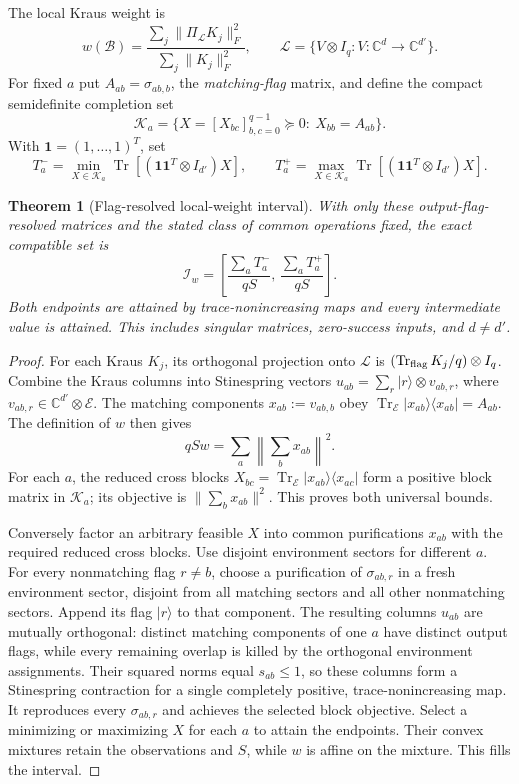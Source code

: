 \documentclass[10pt,letterpaper]{article}
\newtheorem{theorem}{Theorem}
\newcommand{\Tr}{\operatorname{Tr}}
\newcommand{\cB}{\mathcal B}
\newcommand{\K}{\mathcal K}
\newcommand{\C}{\mathbb C}
\begin{document}
The local Kraus weight is
\[
 w(\cB)=\frac{\sum_j\|\Pi_{\mathcal L}K_j\|_F^2}
                  {\sum_j\|K_j\|_F^2},\qquad
 \mathcal L=\{V\otimes I_q: V:\C^d\to\C^{d'}\}.
\]
For fixed $a$ put $A_{ab}=\sigma_{ab,b}$, the \emph{matching-flag} matrix, and
define the compact semidefinite completion set
\[
 \K_a=\{X=[X_{bc}]_{b,c=0}^{q-1}\succeq0:\ X_{bb}=A_{ab}\}.
\]
With $\boldsymbol1=(1,\ldots,1)^T$, set
\[
 T_a^-=\min_{X\in\K_a}\Tr[(\boldsymbol1\boldsymbol1^T\otimes I_{d'})X],
 \qquad
 T_a^+=\max_{X\in\K_a}\Tr[(\boldsymbol1\boldsymbol1^T\otimes I_{d'})X].
\]
\begin{theorem}[Flag-resolved local-weight interval]
With only these output-flag-resolved matrices and the stated class of common operations
fixed, the exact compatible set is
\[
\boxed{\quad
 \mathcal I_w=
 \left[\frac{\sum_aT_a^-}{qS},\,\frac{\sum_aT_a^+}{qS}\right].
 \quad}
\]
Both endpoints are attained by trace-nonincreasing maps and every intermediate value
is attained. This includes singular matrices, zero-success inputs, and $d\ne d'$.
\end{theorem}
\begin{proof}
For each Kraus $K_j$, its orthogonal projection onto $\mathcal L$ is
$(\Tr_{\rm flag}K_j/q)\otimes I_q$. Combine the Kraus columns into Stinespring
vectors $u_{ab}=\sum_r |r\rangle\otimes v_{ab,r}$, where
$v_{ab,r}\in\C^{d'}\otimes\mathcal E$. The matching components
$x_{ab}:=v_{ab,b}$ obey
$\Tr_{\mathcal E}|x_{ab}\rangle\langle x_{ab}|=A_{ab}$. The definition of $w$ then gives
\[
 qSw=\sum_a\left\|\sum_bx_{ab}\right\|^2.
\]
For each $a$, the reduced cross blocks
$X_{bc}=\Tr_{\mathcal E}|x_{ab}\rangle\langle x_{ac}|$
form a positive block matrix in $\K_a$; its objective is
$\|\sum_bx_{ab}\|^2$. This proves both universal bounds.

Conversely factor an arbitrary feasible $X$ into common purifications $x_{ab}$
with the required reduced cross blocks. Use disjoint environment sectors
for different $a$. For every nonmatching flag $r\ne b$, choose a purification
of $\sigma_{ab,r}$ in a fresh environment sector, disjoint from all matching
sectors and all other nonmatching sectors. Append its flag $|r\rangle$ to that
component. The resulting columns $u_{ab}$ are mutually orthogonal: distinct
matching components of one $a$ have distinct output flags, while every remaining
overlap is killed by the orthogonal environment assignments. Their squared
norms equal $s_{ab}\le1$, so these columns form a Stinespring contraction
for a single completely positive, trace-nonincreasing map. It reproduces
every $\sigma_{ab,r}$ and achieves the selected block objective. Select
a minimizing or maximizing $X$ for each $a$ to attain the endpoints.
Their convex mixtures retain the observations and $S$, while $w$ is affine
on the mixture. This fills the interval.
\end{proof}
\end{document}

